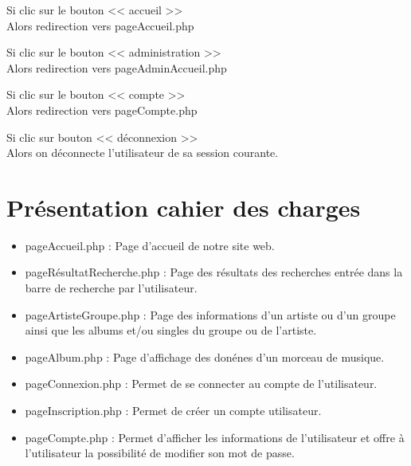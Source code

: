 		\begin{paragraphe}
			Si clic sur le bouton << accueil >> \\
			Alors redirection vers pageAccueil.php
		\end{paragraphe}

		\begin{paragraphe}
			Si clic sur le bouton << administration >> \\
			Alors redirection vers pageAdminAccueil.php
		\end{paragraphe}

		\begin{paragraphe}
			Si clic sur le bouton << compte >> \\
			Alors redirection vers pageCompte.php
		\end{paragraphe}

		\begin{paragraphe}
			Si clic sur bouton << déconnexion >> \\
			Alors on déconnecte l'utilisateur de sa session courante.
		\end{paragraphe}


\newpage

\section{Présentation cahier des charges}

	\begin{paragraphe}
		\begin{itemize}
			\item pageAccueil.php : Page d'accueil de notre site web.
			\item pageRésultatRecherche.php : Page des résultats des recherches entrée dans la barre de recherche par l'utilisateur.
			\item pageArtisteGroupe.php : Page des informations d'un artiste ou d'un groupe ainsi que les albums et/ou singles du groupe ou de l'artiste.
			\item pageAlbum.php : Page d'affichage des donénes d'un morceau de musique.
		\end{itemize}
	\end{paragraphe}

	\begin{paragraphe}
		\begin{itemize}
			\item pageConnexion.php : Permet de se connecter au compte de l'utilisateur.
			\item pageInscription.php : Permet de créer un compte utilisateur.
			\item pageCompte.php : Permet d'afficher les informations de l'utilisateur et offre à l'utilisateur la possibilité de modifier son mot de passe.
		\end{itemize}
	\end{paragraphe}

